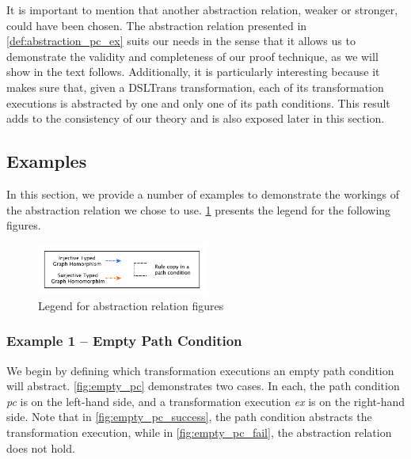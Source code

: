 
It is important to mention that another abstraction relation, weaker or
stronger, could have been chosen. The abstraction relation presented in
\cref{def:abstraction_pc_ex} suits our needs in the sense that it allows us to
demonstrate the validity and completeness of our proof technique, as we will
show in the text follows. Additionally, it is particularly interesting because
it makes sure that, given a DSLTrans transformation, each of its transformation
executions is abstracted by one and only one of its path conditions. This result
adds to the consistency of our theory and is also exposed later in this section.



\subsection{Examples}

In this section, we provide a number of examples to demonstrate the workings of
the abstraction relation we chose to use. \cref{fig:legend} presents the legend
for the following figures.

\begin{figure}[htb]
 \centering
                \includegraphics[width=0.5\textwidth]{./figures/abstraction_relation/legend.pdf}
                \caption{Legend for abstraction relation figures}
                \label{fig:legend}
\end{figure}
                
\subsubsection{Example 1 -- Empty Path Condition}

We begin by defining which transformation executions an empty path condition
will abstract. \cref{fig:empty_pc} demonstrates two cases. In each, the path
condition \textit{pc} is on the left-hand side, and a transformation execution \textit{ex} is on the
right-hand side. Note that in \cref{fig:empty_pc_success}, the path condition
abstracts the transformation execution, while in \cref{fig:empty_pc_fail}, the
abstraction relation does not hold.

